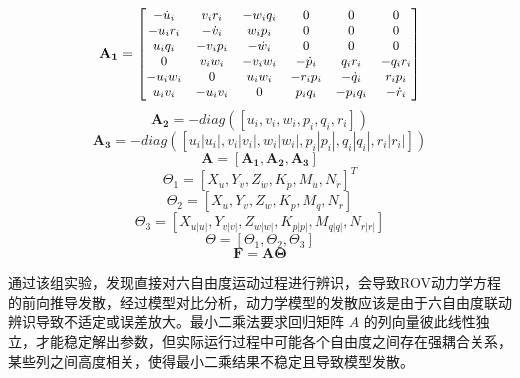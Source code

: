 \begin{equation}
    \mathbf{A_1} = 
    \left[
    \small
    \begin{matrix}
        -\dot{u}_i & v_ir_i & -w_iq_i & 0 & 0 & 0 \\
        -u_ir_i & -\dot{v}_i & w_ip_i & 0 & 0 & 0 \\
        u_iq_i & -v_ip_i & -\dot{w}_i & 0 & 0 & 0 \\
        0 & v_iw_i & -v_iw_i & -\dot{p}_i & q_ir_i & -q_ir_i \\
        -u_iw_i & 0 & u_iw_i & -r_ip_i & -\dot{q}_i & r_ip_i \\
        u_iv_i & -u_iv_i & 0 & p_iq_i & -p_iq_i & -\dot{r}_i \\
    \end{matrix}
    \right]
\end{equation}
\begin{equation}
    \mathbf{A_2} = -diag([u_i,v_i,w_i,p_i,q_i,r_i])
\end{equation}
\begin{equation}
    \mathbf{A_3} = -diag([u_i|u_i|,v_i|v_i|,w_i|w_i|,p_i|p_i|,q_i|q_i|,r_i|r_i|]) 
\end{equation}
\begin{equation}
    \mathbf{A}=[\mathbf{A_1}, \mathbf{A_2}, \mathbf{A_3}] 
\end{equation}
\begin{equation}
    \Theta_1 = [X_{\dot{u}}, Y_{\dot{v}}, Z_{\dot{w}}, K_{\dot{p}}, M_{\dot{u}}, N_{\dot{r}}]^T
\end{equation}
\begin{equation}
    \Theta_2 = [X_u, Y_v, Z_w, K_p, M_q, N_r]
\end{equation}
\begin{equation}
    \Theta_3 = [X_{u|u|}, Y_{v|v|}, Z_{w|w|}, K_{p|p|}, M_{q|q|}, N_{r|r|}]
\end{equation}
\begin{equation}
    \Theta = [ \Theta_1, \Theta_2, \Theta_3 ]
\end{equation}
\begin{equation}
    \boldsymbol{F} = \boldsymbol{A}\boldsymbol{\Theta}
\end{equation}

通过该组实验，发现直接对六自由度运动过程进行辨识，会导致ROV动力学方程的前向推导发散，经过模型对比分析，动力学模型的发散应该是由于六自由度联动辨识导致不适定或误差放大。最小二乘法要求回归矩阵 $A$ 的列向量彼此线性独立，才能稳定解出参数，但实际运行过程中可能各个自由度之间存在强耦合关系，某些列之间高度相关，使得最小二乘结果不稳定且导致模型发散。


